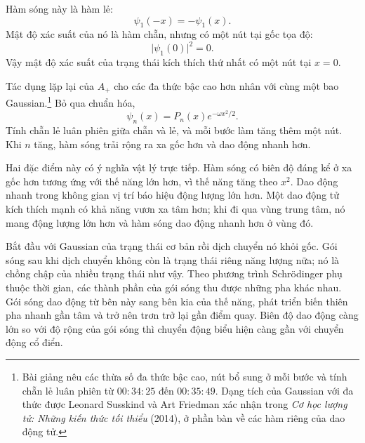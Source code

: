 Hàm sóng này là hàm lẻ:
\begin{equation}
\psi_{1}(-x)=-\psi_{1}(x).
\end{equation}
Mật độ xác suất của nó là hàm chẵn, nhưng có một nút tại gốc tọa độ:
\begin{equation}
\lvert\psi_{1}(0)\rvert^{2}=0.
\end{equation}
Vậy mật độ xác suất của trạng thái kích thích thứ nhất có một nút tại \(x=0\).

Tác dụng lặp lại của \(A_{+}\) cho các đa thức bậc cao hơn nhân với cùng một bao Gaussian.\footnote{Bài giảng nêu các thừa số đa thức bậc cao, nút bổ sung ở mỗi bước và tính chẵn lẻ luân phiên từ \(00{:}34{:}25\) đến \(00{:}35{:}49\). Dạng tích của Gaussian với đa thức được Leonard Susskind và Art Friedman xác nhận trong \emph{Cơ học lượng tử: Những kiến thức tối thiểu} (2014), ở phần bàn về các hàm riêng của dao động tử.} Bỏ qua chuẩn hóa,
\begin{equation}
\psi_{n}(x)=P_{n}(x)e^{-\omega x^{2}/2}.
\end{equation}
Tính chẵn lẻ luân phiên giữa chẵn và lẻ, và mỗi bước làm tăng thêm một nút. Khi \(n\) tăng, hàm sóng trải rộng ra xa gốc hơn và dao động nhanh hơn.

Hai đặc điểm này có ý nghĩa vật lý trực tiếp. Hàm sóng có biên độ đáng kể ở xa gốc hơn tương ứng với thế năng lớn hơn, vì thế năng tăng theo \(x^{2}\). Dao động nhanh trong không gian vị trí báo hiệu động lượng lớn hơn. Một dao động tử kích thích mạnh có khả năng vươn xa tâm hơn; khi đi qua vùng trung tâm, nó mang động lượng lớn hơn và hàm sóng dao động nhanh hơn ở vùng đó.

\begin{classroomqa}
\end{classroomqa}

Bắt đầu với Gaussian của trạng thái cơ bản rồi dịch chuyển nó khỏi gốc. Gói sóng sau khi dịch chuyển không còn là trạng thái riêng năng lượng nữa; nó là chồng chập của nhiều trạng thái như vậy. Theo phương trình Schr\"odinger phụ thuộc thời gian, các thành phần của gói sóng thu được những pha khác nhau. Gói sóng dao động từ bên này sang bên kia của thế năng, phát triển biến thiên pha nhanh gần tâm và trở nên trơn trở lại gần điểm quay. Biên độ dao động càng lớn so với độ rộng của gói sóng thì chuyển động biểu hiện càng gần với chuyển động cổ điển.

